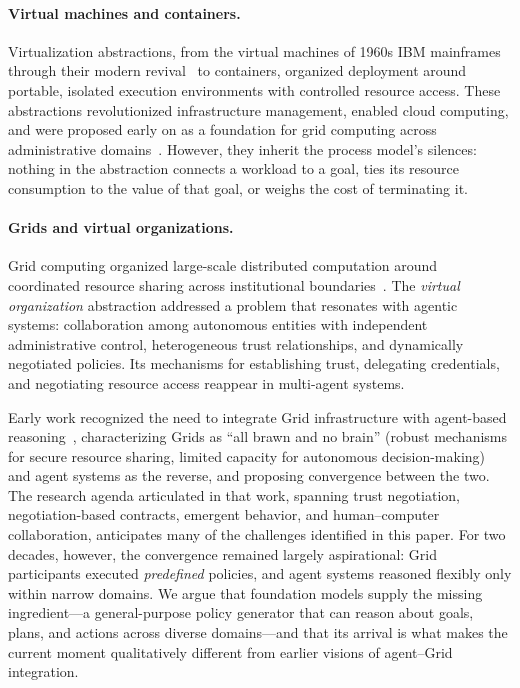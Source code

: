 \documentclass[11pt]{article}
\begin{document}
\paragraph{Virtual machines and containers.}
Virtualization abstractions, from the virtual machines of 1960s IBM mainframes~\cite{creasy_vm370} through their modern revival~\cite{barham_xen} to containers, organized deployment around portable, isolated execution environments with controlled resource access. These abstractions revolutionized infrastructure management, enabled cloud computing, and were proposed early on as a foundation for grid computing across administrative domains~\cite{figueiredo_vm_grid}. However, they inherit the process model's silences: nothing in the abstraction connects a workload to a goal, ties its resource consumption to the value of that goal, or weighs the cost of terminating it.

\paragraph{Grids and virtual organizations.}
Grid computing organized large-scale distributed computation around coordinated resource sharing across institutional boundaries~\cite{foster_anatomy}. The \textit{virtual organization} abstraction addressed a problem that resonates with agentic systems: collaboration among autonomous entities with independent administrative control, heterogeneous trust relationships, and dynamically negotiated policies. Its mechanisms for establishing trust, delegating credentials, and negotiating resource access reappear in multi-agent systems.

Early work recognized the need to integrate Grid infrastructure with agent-based reasoning~\cite{foster_brain_brawn}, characterizing Grids as ``all brawn and no brain'' (robust mechanisms for secure resource sharing, limited capacity for autonomous decision-making) and agent systems as the reverse, and proposing convergence between the two. The research agenda articulated in that work, spanning trust negotiation, negotiation-based contracts, emergent behavior, and human--computer collaboration, anticipates many of the challenges identified in this paper. For two decades, however, the convergence remained largely aspirational: Grid participants executed \textit{predefined} policies, and agent systems reasoned flexibly only within narrow domains. We argue that foundation models supply the missing ingredient---a general-purpose policy generator that can reason about goals, plans, and actions across diverse domains---and that its arrival is what makes the current moment qualitatively different from earlier visions of agent--Grid integration.
\end{document}
